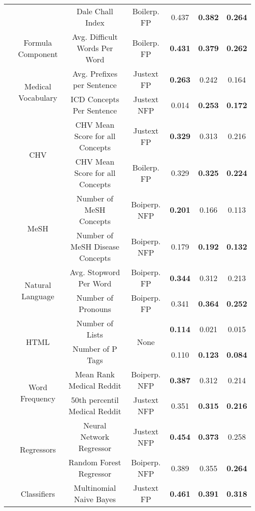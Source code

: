 \begin{table}[t]
{\begin{tabular}{c|c|c|c|c|c|c}
 &  & Dale Chall Index & Boilerp. FP & 0.437 & \textbf{0.382} & \textbf{0.264}\tabularnewline
\cmidrule{2-7} 
 & Formula Component & Avg. Difficult Words Per Word & Boilerp. FP & \textbf{0.431} & \textbf{0.379} & \textbf{0.262}\tabularnewline
\cmidrule{2-7} 
 & \multirow{2}{*}{Medical Vocabulary} & Avg. Prefixes per Sentence & Justext FP & \textbf{0.263} & 0.242 & 0.164\tabularnewline
 &  & ICD Concepts Per Sentence & Justext NFP & 0.014 & \textbf{0.253} & \textbf{0.172}\tabularnewline
\cmidrule{2-7} 
 & \multirow{2}{*}{CHV} & CHV Mean Score for all Concepts & Justext FP & \textbf{0.329} & 0.313 & 0.216\tabularnewline
 &  & CHV Mean Score for all Concepts & Boilerp. FP & 0.329 & \textbf{0.325} & \textbf{0.224}\tabularnewline
\cmidrule{2-7} 
 & \multirow{2}{*}{MeSH} & Number of MeSH Concepts & Boiperp. NFP & \textbf{0.201} & 0.166 & 0.113\tabularnewline
 &  & Number of MeSH Disease Concepts & Boiperp. NFP & 0.179 & \textbf{0.192} & \textbf{0.132}\tabularnewline
\cmidrule{2-7} 
 & \multirow{2}{*}{Natural Language} & Avg. Stopword Per Word & Boiperp. FP & \textbf{0.344} & 0.312 & 0.213\tabularnewline
 &  & Number of Pronouns & Boiperp. FP & 0.341 & \textbf{0.364} & \textbf{0.252}\tabularnewline
\cmidrule{2-7} 
 & \multirow{2}{*}{HTML} & Number of Lists & \multirow{2}{*}{None} & \textbf{0.114} & 0.021 & 0.015\tabularnewline
 &  & Number of P Tags &  & 0.110 & \textbf{0.123} & \textbf{0.084}\tabularnewline
\cmidrule{2-7} 
 & \multirow{2}{*}{Word Frequency} & Mean Rank Medical Reddit & Boiperp. NFP & \textbf{0.387} & 0.312 & 0.214\tabularnewline
 &  & 50th percentil Medical Reddit & Justext NFP & 0.351 & \textbf{0.315} & \textbf{0.216}\tabularnewline
\cmidrule{2-7} 
 & \multirow{2}{*}{Regressors} & Neural Network Regressor & Justext NFP & \textbf{0.454} & \textbf{0.373} & 0.258\tabularnewline
 &  & Random Forest Regressor & Boiperp. NFP & 0.389 & 0.355 & \textbf{0.264}\tabularnewline
\cmidrule{2-7} 
 & Classifiers & Multinomial Naive Bayes & Justext FP & \textbf{0.461} & \textbf{0.391} & \textbf{0.318}\tabularnewline
\bottomrule
\end{tabular}
} %
\end{table}
